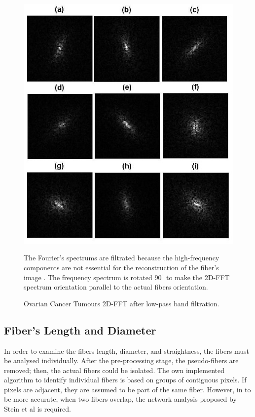 \documentclass[12pt,a4paper]{article}
\begin{document}
\begin{figure}
  \includegraphics[width=\linewidth]{FiguresDisertation/figure6.jpg}
  \caption{Ovarian Cancer Tumours 2D-FFT after low-pass band filtration.}
  \medskip
  \small
  The Fourier's spectrums are filtrated because the high-frequency components are not essential for the reconstruction of the fiber's image . The frequency spectrum is rotated $90^{\circ}$ to make the 2D-FFT spectrum orientation parallel to the actual fibers orientation.
\end{figure}
\subsection{Fiber's Length and Diameter}
In order to examine the fibers length, diameter, and straightness, the fibers must be analysed individually. After the pre-processing stage, the pseudo-fibers are removed; then, the actual fibers could be isolated. The own implemented algorithm to identify individual fibers is based on groups of contiguous pixels. If pixels are adjacent, they are assumed to be part of the same fiber. However, in to be more accurate, when two fibers overlap, the network analysis proposed by Stein et al is required.
\end{document}
